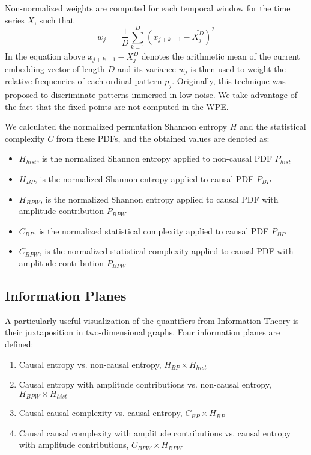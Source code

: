 Non-normalized weights are computed for each temporal window for the time series $X$, such that
\begin{equation}
\label{WPE_weigth}
w_j~=~\frac{1}{D}\sum_{k=1}^{D} \left(x_{j+k-1}-\bar{X_j^D}\right)^2
\end{equation}
In the equation above $x_{j+k-1}-\bar{X_j^D}$ denotes the arithmetic mean of the current embedding vector of length $D$ and its variance $w_j$ is then used to weight the relative frequencies of each ordinal pattern $p_j$.
Originally, this technique was proposed to discriminate patterns immersed in low noise.
We take advantage of the fact that the fixed points are not computed in the WPE.

We calculated the normalized permutation Shannon entropy $H$ and the statistical complexity $C$ from these PDFs, and the obtained values are denoted as:
\begin{itemize}[leftmargin=*,labelsep=5.8mm]
	\item $H_{hist}$, is the normalized Shannon entropy applied to non-causal PDF $P_{hist}$
	\item $H_{BP}$, is the normalized Shannon entropy applied to causal PDF $P_{BP}$
	\item $H_{BPW}$, is the normalized Shannon entropy applied to causal PDF with amplitude contribution $P_{BPW}$
	\item $C_{BP}$, is the normalized statistical complexity applied to causal PDF $P_{BP}$
	\item $C_{BPW}$, is the normalized statistical complexity applied to causal PDF with amplitude contribution $P_{BPW} $
\end{itemize}

\subsection{Information Planes}

A particularly useful visualization of the quantifiers from Information Theory is their juxtaposition in two-dimensional graphs.
Four information planes are defined:
\begin{enumerate}[leftmargin=*,labelsep=4.9mm]
\item	Causal entropy vs. non-causal entropy, $H_{BP} \times H_{hist}$
\item	Causal entropy with amplitude contributions vs. non-causal entropy, $H_{BPW} \times H_{hist}$
\item	Causal causal complexity vs. causal entropy, $C_{BP} \times H_{BP}$
\item	Causal causal complexity with amplitude contributions vs. causal entropy with amplitude contributions, $C_{BPW} \times H_{BPW}$
\end{enumerate}

